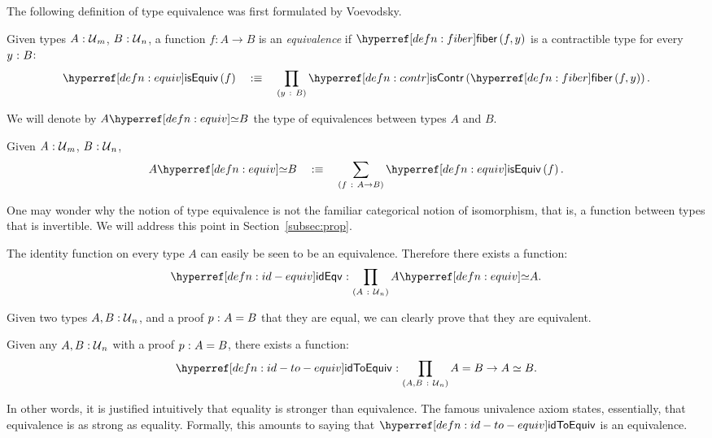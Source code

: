 The following definition of type equivalence was first formulated by Voevodsky.
\begin{defn}[Equivalence]\label{defn:equiv}
  Given types $A\hspace{0.1mm}:\hspace{0.1mm}\mathcal{U}{}_m$, $B\hspace{0.1mm}:\hspace{0.1mm}\mathcal{U}{}_n$, a function $f : A \rightarrow B$ is an
  \emph{equivalence} if $\fiber{f}{y}$ is a contractible type for every $y\hspace{0.1mm}:\hspace{0.1mm}B$:
  \begin{equation*}
    \isequiv{f} \quad\is\quad \pity{y}{B}{\iscontr{\fiber{f}{y}}}.
  \end{equation*}
\end{defn}

We will denote by $\typequiv{A}{B}$ the type of equivalences between types $A$ and $B$.
\begin{defn}
  Given $A\hspace{0.1mm}:\hspace{0.1mm}\mathcal{U}{}_m$, $B\hspace{0.1mm}:\hspace{0.1mm}\mathcal{U}{}_n$,
  \begin{equation*}
    \typequiv{A}{B} \quad\is\quad \sigmaty{f}{A \rightarrow B}{\isequiv{f}}.
  \end{equation*}
\end{defn}

One may wonder why the notion of type equivalence is not the familiar categorical notion
of isomorphism, that is, a function between types that is invertible. We will address this
point in Section~\ref{subsec:prop}.

\begin{defn}\label{defn:id-equiv}
  The identity function on every type $A$ can easily be seen to be an equivalence.
  Therefore there exists a function:
  \begin{equation*}
    \oftyI{\idequivnm}{\pity{A}{\univ{}_n}{\typequiv{A}{A}}}.
  \end{equation*}
\end{defn}

Given two types $A, B:\mathcal{U}{}_n$, and a proof $p\hspace{0.1mm}:\hspace{0.1mm}A = B$ that they are
equal, we can clearly prove that they are equivalent.
\begin{defn}\label{defn:id-to-equiv}
  Given any $A, B:\mathcal{U}{}_n$ with a proof $p\hspace{0.1mm}:\hspace{0.1mm}A = B$, there exists a
  function:
  \begin{equation*}
    \oftyI{\idtoeqvnm{}}{\pity{A, B}{\univ{}_n}{A = B \rightarrow A \simeq B}}.
  \end{equation*}
\end{defn}

In other words, it is justified intuitively that equality is stronger than equivalence.
The famous univalence axiom states, essentially, that equivalence is as strong as
equality. Formally, this amounts to saying that $\idtoeqvnm{}$ is an equivalence.

